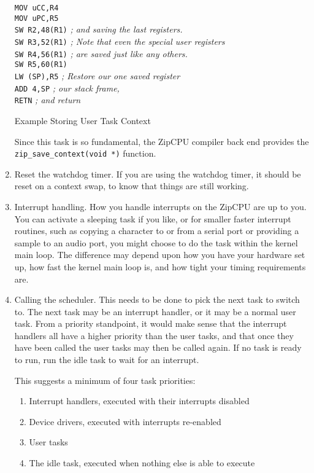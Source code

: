 \documentclass{gqtekspec}
\begin{document}
\begin{enumerate}
\begin{table}
\begin{center}
\begin{tabbing}
\>        {\tt MOV uCC,R4} \\
\>        {\tt MOV uPC,R5} \\
\>        {\tt SW R2,48(R1)}	\> {\em ; and saving the last registers.}\\
\>        {\tt SW R3,52(R1)}	\> {\em ; Note that even the special user registers }\\
\>        {\tt SW R4,56(R1)}	\> {\em ; are saved just like any others. }\\
\>        {\tt SW R5,60(R1)} \\
\>        {\tt LW (SP),R5}	\> {\em ; Restore our one saved register}\\
\>        {\tt ADD 4,SP}		\> {\em ; our stack frame,} \\
\>        {\tt RETN}		\> {\em ; and return }\\
\end{tabbing}
\caption{Example Storing User Task Context}\label{tbl:context-out}
\end{center}\end{table}
Since this task is so fundamental, the ZipCPU compiler back end provides
the {\tt zip\_save\_context(void *)} function.  

\item Reset the watchdog timer.  If you are using the watchdog timer, it should
	be reset on a context swap, to know that things are still working.

\item Interrupt handling.  How you handle interrupts on the ZipCPU are up to
	you.  You can activate a sleeping task if you like, or for smaller
	faster interrupt routines, such as copying a character to or from a 
	serial port or providing a sample to an audio port, you might choose
	to do the task within the kernel main loop.  The difference may 
	depend upon how you have your hardware set up, how fast the
	kernel main loop is, and how tight your timing requirements are.

\item Calling the scheduler.  This needs to be done to pick the next task
	to switch to.  The next task may be an interrupt handler, or it may
	be a normal user task.  From a priority standpoint, it would make
	sense that the interrupt handlers all have a higher priority than
	the user tasks, and that once they have been called the user tasks
	may then be called again.  If no task is ready to run, run the idle
	task to wait for an interrupt.

	This suggests a minimum of four task priorities:
	\begin{enumerate}
	\item Interrupt handlers, executed with their interrupts disabled
	\item Device drivers, executed with interrupts re-enabled
	\item User tasks
	\item The idle task, executed when nothing else is able to execute
	\end{enumerate}


\end{enumerate}
\end{document}
